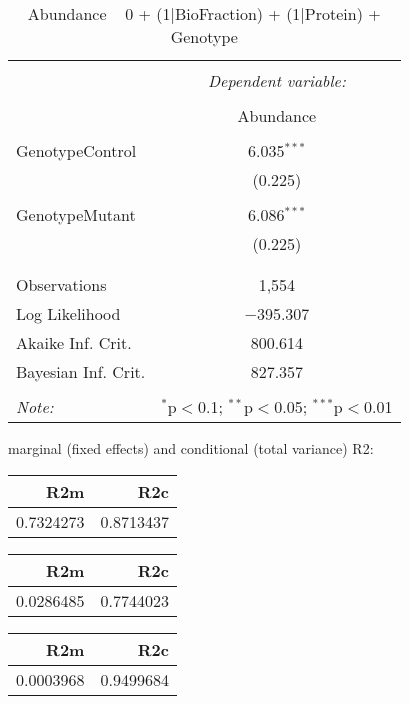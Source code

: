 \documentclass[11pt]{report}
\begin{document}
\begin{table}[!htbp] \centering 
  \caption{Abundance ~ 0 + (1|BioFraction) + (1|Protein) + Genotype} 
  \label{} 
\begin{tabular}{@{\extracolsep{5pt}}lc} 
\\[-1.8ex]\hline 
\hline \\[-1.8ex] 
 & \multicolumn{1}{c}{\textit{Dependent variable:}} \\ 
\cline{2-2} 
\\[-1.8ex] & Abundance \\ 
\hline \\[-1.8ex] 
 GenotypeControl & 6.035$^{***}$ \\ 
  & (0.225) \\ 
  & \\ 
 GenotypeMutant & 6.086$^{***}$ \\ 
  & (0.225) \\ 
  & \\ 
\hline \\[-1.8ex] 
Observations & 1,554 \\ 
Log Likelihood & $-$395.307 \\ 
Akaike Inf. Crit. & 800.614 \\ 
Bayesian Inf. Crit. & 827.357 \\ 
\hline 
\hline \\[-1.8ex] 
\textit{Note:}  & \multicolumn{1}{r}{$^{*}$p$<$0.1; $^{**}$p$<$0.05; $^{***}$p$<$0.01} \\ 
\end{tabular} 
\end{table} 
marginal (fixed effects) and conditional (total variance) R2:

\begin{tabular}{r|r}
\hline
R2m & R2c\\
\hline
0.7324273 & 0.8713437\\
\hline
\end{tabular}

\begin{tabular}{r|r}
\hline
R2m & R2c\\
\hline
0.0286485 & 0.7744023\\
\hline
\end{tabular}

\begin{tabular}{r|r}
\hline
R2m & R2c\\
\hline
0.0003968 & 0.9499684\\
\hline
\end{tabular}
\end{document}
